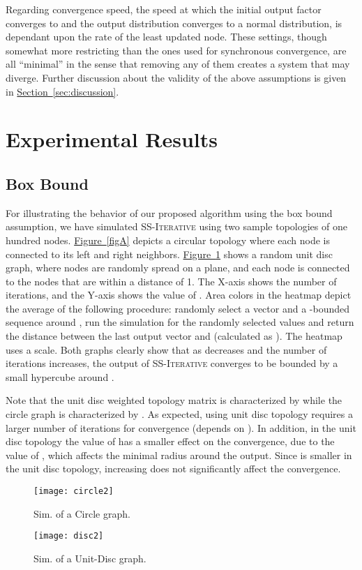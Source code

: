 \documentclass[preprint,12pt]{elsarticle}
\newcommand{\namedref}[2]{\hyperref[#2]{#1~\ref*{#2}}}
\newcommand{\sectionref}[1]{\namedref{Section}{#1}}
\newcommand{\figureref}[1]{\namedref{Figure}{#1}}
\newcommand{\syncAlg}{\textsc{SS-Iterative}\xspace}
\begin{document}
Regarding convergence speed, the speed at which the initial output factor converges to  and the output distribution converges to a normal distribution, is dependant upon the rate of the least updated node. These settings, though somewhat more restricting than the ones used for synchronous convergence, are all ``minimal'' in the sense that removing any of them creates a system that may diverge. Further discussion about the validity of the
above assumptions is given in \sectionref{sec:discussion}.

\section{Experimental Results}\label{sec:simlation}
\subsection{Box Bound}
For illustrating the behavior of our proposed algorithm using the box
bound assumption, we have simulated \syncAlg using two sample topologies of one hundred nodes.
\figureref{figA} depicts a circular topology where each node is
connected to its left and right neighbors. \figureref{figB} shows a
random unit disc graph, where nodes are randomly spread on a
plane, and each node is connected to the nodes that are within a
distance of 1.  The X-axis shows the number of iterations, and the Y-axis shows the value of
. Area colors in the heatmap depict the
average of the following procedure: randomly select a vector
 and a -bounded sequence around ,
run the simulation for the randomly selected values and return the
 distance between the last output vector and 
(calculated as ). The heatmap uses a  scale. Both graphs clearly show that as  decreases
and the number of iterations increases, the output of \syncAlg
converges to be bounded by a small hypercube around .

Note that the unit disc weighted topology matrix is characterized by
 while the circle graph
is characterized by . As expected,
using unit disc topology requires a larger number of iterations
for convergence (depends on ). In addition, in the unit
disc topology the value of  has a smaller effect on the
convergence, due to the value of , which affects the minimal radius around the output.
Since  is smaller in the unit disc topology,
increasing  does not significantly affect the convergence.

\begin{figure}[h!]
\begin{minipage}[b]{0.5\linewidth}
\centering
  \hspace{1.25in} \texttt{[image: circle2]}
  \vspace{-0.5cm}
  \caption{Sim. of a Circle graph.}
  \label{figA}
\end{minipage}
\begin{minipage}[b]{0.5\linewidth}
\centering
  \hspace{1.25in} \texttt{[image: disc2]}
  \vspace{-0.5cm}
  \caption{Sim. of a Unit-Disc graph.}
  \label{figB}
\end{minipage}
\end{figure}
\end{document}
